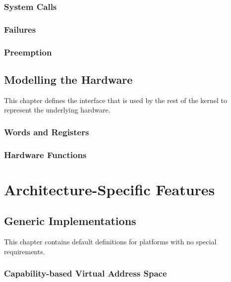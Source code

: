 \documentclass[a4paper,11pt,twoside]{report}
\begin{document}
\section{System Calls}\label{sec:model.syscall}


\section{Failures}\label{sec:model.failures}


\section{Preemption}\label{sec:model.preemption}


\chapter{Modelling the Hardware}\label{sec:machine}\label{ch:code:machine}

This chapter defines the interface that is used by the rest of the kernel to represent the underlying hardware.

\section{Words and Registers}\label{sec:machine.registerset}


\section{Hardware Functions}\label{sec:machine.hardware}


\part{Architecture-Specific Features}

\chapter{Generic Implementations}

This chapter contains default definitions for platforms with no special requirements.

\section{Capability-based Virtual Address Space}

\end{document}
